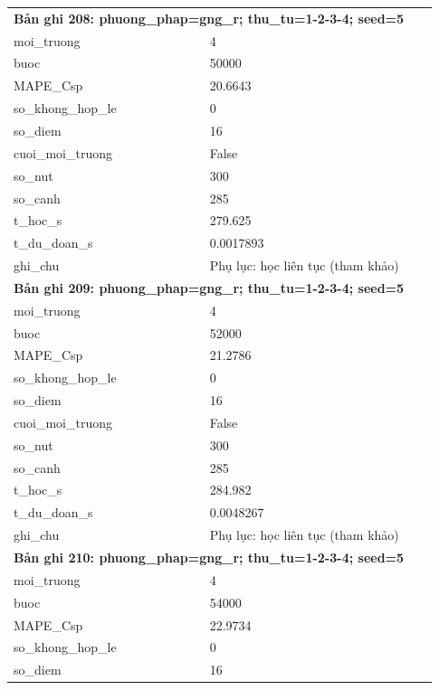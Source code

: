 \begin{longtable}{p{0.43\linewidth}p{0.50\linewidth}}
\midrule
\multicolumn{2}{p{0.95\linewidth}}{\textbf{Bản ghi 208: phuong\_phap=gng\_r; thu\_tu=1-2-3-4; seed=5}} \\
moi\_\allowbreak truong & 4 \\
buoc & 50000 \\
MAPE\_\allowbreak Csp & 20.6643 \\
so\_\allowbreak khong\_\allowbreak hop\_\allowbreak le & 0 \\
so\_\allowbreak diem & 16 \\
cuoi\_\allowbreak moi\_\allowbreak truong & False \\
so\_\allowbreak nut & 300 \\
so\_\allowbreak canh & 285 \\
t\_\allowbreak hoc\_\allowbreak s & 279.625 \\
t\_\allowbreak du\_\allowbreak doan\_\allowbreak s & 0.0017893 \\
ghi\_\allowbreak chu & Phụ lục: học liên tục (tham khảo) \\
\midrule
\multicolumn{2}{p{0.95\linewidth}}{\textbf{Bản ghi 209: phuong\_phap=gng\_r; thu\_tu=1-2-3-4; seed=5}} \\
moi\_\allowbreak truong & 4 \\
buoc & 52000 \\
MAPE\_\allowbreak Csp & 21.2786 \\
so\_\allowbreak khong\_\allowbreak hop\_\allowbreak le & 0 \\
so\_\allowbreak diem & 16 \\
cuoi\_\allowbreak moi\_\allowbreak truong & False \\
so\_\allowbreak nut & 300 \\
so\_\allowbreak canh & 285 \\
t\_\allowbreak hoc\_\allowbreak s & 284.982 \\
t\_\allowbreak du\_\allowbreak doan\_\allowbreak s & 0.0048267 \\
ghi\_\allowbreak chu & Phụ lục: học liên tục (tham khảo) \\
\midrule
\multicolumn{2}{p{0.95\linewidth}}{\textbf{Bản ghi 210: phuong\_phap=gng\_r; thu\_tu=1-2-3-4; seed=5}} \\
moi\_\allowbreak truong & 4 \\
buoc & 54000 \\
MAPE\_\allowbreak Csp & 22.9734 \\
so\_\allowbreak khong\_\allowbreak hop\_\allowbreak le & 0 \\
so\_\allowbreak diem & 16 \\

\end{longtable}
